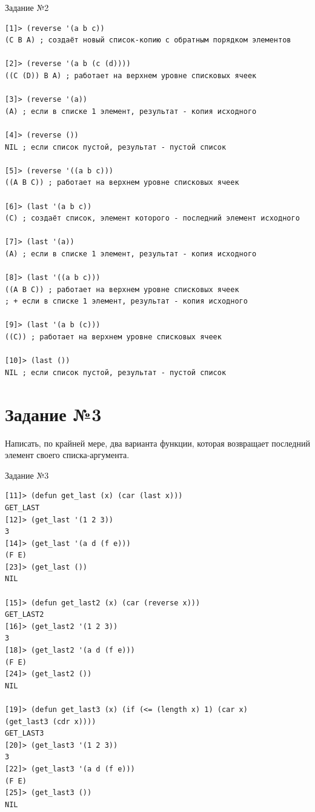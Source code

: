 \begin{code}
\caption{Задание №2}
\label{code:bf2}
\begin{verbatim}
[1]> (reverse '(a b c))
(C B A) ; создаёт новый список-копию с обратным порядком элементов

[2]> (reverse '(a b (c (d))))
((C (D)) B A) ; работает на верхнем уровне списковых ячеек

[3]> (reverse '(a))
(A) ; если в списке 1 элемент, результат - копия исходного

[4]> (reverse ())
NIL ; если список пустой, результат - пустой список

[5]> (reverse '((a b c)))
((A B C)) ; работает на верхнем уровне списковых ячеек

[6]> (last '(a b c))
(C) ; создаёт список, элемент которого - последний элемент исходного

[7]> (last '(a))
(A) ; если в списке 1 элемент, результат - копия исходного

[8]> (last '((a b c)))
((A B C)) ; работает на верхнем уровне списковых ячеек
; + если в списке 1 элемент, результат - копия исходного

[9]> (last '(a b (c)))
((C)) ; работает на верхнем уровне списковых ячеек

[10]> (last ())
NIL ; если список пустой, результат - пустой список
\end{verbatim}
\end{code}

\section{Задание №3}
Написать, по крайней мере, два варианта функции, которая возвращает последний элемент своего списка-аргумента.

\begin{code}
\caption{Задание №3}
\label{code:bf3}
\begin{verbatim}
[11]> (defun get_last (x) (car (last x)))
GET_LAST
[12]> (get_last '(1 2 3))
3
[14]> (get_last '(a d (f e)))
(F E)
[23]> (get_last ())
NIL

[15]> (defun get_last2 (x) (car (reverse x)))
GET_LAST2
[16]> (get_last2 '(1 2 3))
3
[18]> (get_last2 '(a d (f e)))
(F E)
[24]> (get_last2 ())
NIL

[19]> (defun get_last3 (x) (if (<= (length x) 1) (car x) 
(get_last3 (cdr x))))
GET_LAST3
[20]> (get_last3 '(1 2 3))
3
[22]> (get_last3 '(a d (f e)))
(F E)
[25]> (get_last3 ())
NIL
\end{verbatim}
\end{code}

